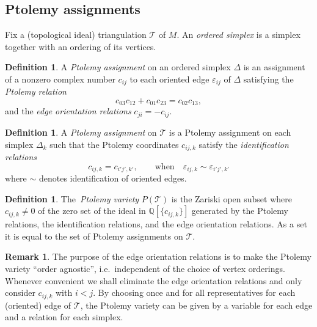 \documentclass[11pt]{amsart}
\theoremstyle{plain}
\theoremstyle{definition}
\newtheorem{definition}[theorem]{Definition}
\newtheorem{remark}[theorem]{Remark}
\numberwithin{equation}{section}
\newcommand{\Q}{\mathbb Q}
\newcommand{\T}{\mathcal T}
\begin{document}
\subsection{Ptolemy assignments}


Fix a (topological ideal) triangulation $\T$ of $M$. An \emph{ordered simplex} is a simplex together with an ordering of its vertices.
\begin{definition}
A \emph{Ptolemy assignment} on an ordered simplex $\Delta$ is an assignment of a nonzero complex number $c_{ij}$ to each oriented edge $\varepsilon_{ij}$ of $\Delta$ satisfying the \emph{Ptolemy relation}
\begin{equation}\label{eq:PtolemyRelation}
c_{03}c_{12}+c_{01}c_{23}=c_{02}c_{13},
\end{equation}
and the \emph{edge orientation relations} $c_{ji}=-c_{ij}$.
\end{definition}

\begin{definition}
A \emph{Ptolemy assignment} on $\T$ is a Ptolemy assignment on each simplex $\Delta_k$ such that the Ptolemy coordinates $c_{ij,k}$ satisfy the \emph{identification relations}
\begin{equation}
c_{ij,k}=c_{i'j',k'},\qquad\text{when}\quad \varepsilon_{ij,k}\sim\varepsilon_{i'j',k'} 
\end{equation}
where $\sim$ denotes identification of oriented edges.
\end{definition}

\begin{definition}\label{def:PtolemyVariety} The~\emph{Ptolemy variety} $P(\T)$ is the Zariski open subset where $c_{ij,k}\neq 0$ of the zero set of the ideal in $\Q[\{c_{ij,k}\}]$ generated by the Ptolemy relations, the identification relations, and the edge orientation relations. As a set it is equal to the set of Ptolemy assignments on $\T$.
\end{definition}



\begin{remark}  The purpose of the edge orientation relations is to make the Ptolemy variety ``order agnostic'', i.e.~independent of the choice of vertex orderings. Whenever convenient we shall eliminate the edge orientation relations and only consider $c_{ij,k}$ with $i<j$. By choosing once and for all representatives for each (oriented) edge of $\T$, the Ptolemy variety can be given by a variable for each edge and a relation for each simplex.
\end{remark}
\end{document}

